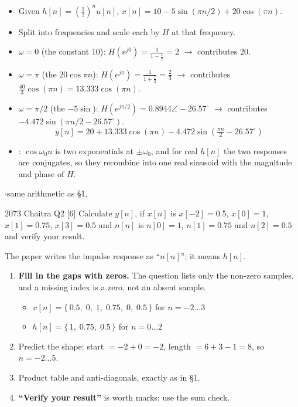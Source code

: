 \begin{itemize}
  \item Given $h[n]=(\frac12)^nu[n]$, \;
        $x[n]=10-5\sin(\pi n/2)+20\cos(\pi n)$.
  \item {} Split into frequencies and scale each by $H$ at that
        frequency.
  \item $\omega=0$ (the constant 10): $H(e^{j0})=\frac{1}{1-\frac12}=2$
        $\rightarrow$ contributes $20$.
  \item $\omega=\pi$ (the $20\cos\pi n$): $H(e^{j\pi})=\frac{1}{1+\frac12}=\frac23$
        $\rightarrow$ contributes $\frac{40}{3}\cos(\pi n)=13.333\cos(\pi n)$.
  \item $\omega=\pi/2$ (the $-5\sin$): $H(e^{j\pi/2})=0.8944\angle-26.57^\circ$
        $\rightarrow$ contributes $-4.472\sin(\pi n/2-26.57^\circ)$.
        \[ y[n]=20+13.333\cos(\pi n)-4.472\sin\!\left(\tfrac{\pi n}{2}-26.57^\circ\right) \]
  \item {}: $\cos\omega_0n$ is two exponentials at
        $\pm\omega_0$, and for real $h[n]$ the two responses are conjugates, so they
        recombine into one real sinusoid with the magnitude and phase of $H$.
\end{itemize}

\hr

{\color{sub}\footnotesize {} 
\gap$\cdot$\gap same arithmetic as \S1, }

\begin{asked}{2073 Chaitra \textperiodcentered{} Q2 \textperiodcentered{} [6]}
Calculate $y[n]$, if $x[n]$ is $x[-2]=0.5$, $x[0]=1$, $x[1]=0.75$, $x[3]=0.5$ and $n[n]$ is
$n[0]=1$, $n[1]=0.75$ and $n[2]=0.5$ and verify your result.
\end{asked}
{\color{sub}\footnotesize The paper writes the impulse response as ``$n[n]$''; it means
$h[n]$.}

\begin{enumerate}
  \item \textbf{Fill in the gaps with zeros.} The question lists only the non-zero samples,
        and a missing index is a zero, not an absent sample.
  \begin{itemize}
    \item $x[n]=\{\,0.5,\;0,\;\underline{1},\;0.75,\;0,\;0.5\,\}$ for $n=-2\ldots3$
    \item $h[n]=\{\,\underline{1},\;0.75,\;0.5\,\}$ for $n=0\ldots2$
  \end{itemize}
  \item Predict the shape: start $=-2+0=-2$, length $=6+3-1=8$, so $n=-2\ldots5$.
  \item Product table and anti-diagonals, exactly as in \S1.
  \item \textbf{``Verify your result''} is worth marks: use the sum check.
\end{enumerate}

